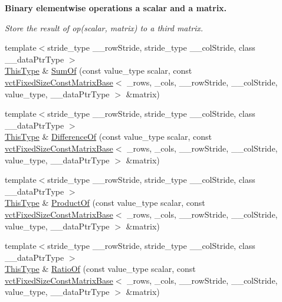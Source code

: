 \begin{Indent}{\bf Binary elementwise operations a scalar and a matrix.}\par
{\em Store the result of op(scalar, matrix) to a third matrix. }\begin{DoxyCompactItemize}
\item 
{\footnotesize template$<$stride\-\_\-type \-\_\-\-\_\-row\-Stride, stride\-\_\-type \-\_\-\-\_\-col\-Stride, class \-\_\-\-\_\-data\-Ptr\-Type $>$ }\\\hyperlink{classvct_fixed_size_const_matrix_base_a7ec66a96ed7e08ce9ff54093133c9d8d}{This\-Type} \& \hyperlink{classvct_fixed_size_matrix_base_afad329402953580776ff2c72254edc61}{Sum\-Of} (const value\-\_\-type scalar, const \hyperlink{classvct_fixed_size_const_matrix_base}{vct\-Fixed\-Size\-Const\-Matrix\-Base}$<$ \-\_\-rows, \-\_\-cols, \-\_\-\-\_\-row\-Stride, \-\_\-\-\_\-col\-Stride, value\-\_\-type, \-\_\-\-\_\-data\-Ptr\-Type $>$ \&matrix)
\item 
{\footnotesize template$<$stride\-\_\-type \-\_\-\-\_\-row\-Stride, stride\-\_\-type \-\_\-\-\_\-col\-Stride, class \-\_\-\-\_\-data\-Ptr\-Type $>$ }\\\hyperlink{classvct_fixed_size_const_matrix_base_a7ec66a96ed7e08ce9ff54093133c9d8d}{This\-Type} \& \hyperlink{classvct_fixed_size_matrix_base_a53bdb7c0294f40c67f4338bdb05ecf93}{Difference\-Of} (const value\-\_\-type scalar, const \hyperlink{classvct_fixed_size_const_matrix_base}{vct\-Fixed\-Size\-Const\-Matrix\-Base}$<$ \-\_\-rows, \-\_\-cols, \-\_\-\-\_\-row\-Stride, \-\_\-\-\_\-col\-Stride, value\-\_\-type, \-\_\-\-\_\-data\-Ptr\-Type $>$ \&matrix)
\item 
{\footnotesize template$<$stride\-\_\-type \-\_\-\-\_\-row\-Stride, stride\-\_\-type \-\_\-\-\_\-col\-Stride, class \-\_\-\-\_\-data\-Ptr\-Type $>$ }\\\hyperlink{classvct_fixed_size_const_matrix_base_a7ec66a96ed7e08ce9ff54093133c9d8d}{This\-Type} \& \hyperlink{classvct_fixed_size_matrix_base_a5ba858bd9d276410c41e4e43fbf0eea5}{Product\-Of} (const value\-\_\-type scalar, const \hyperlink{classvct_fixed_size_const_matrix_base}{vct\-Fixed\-Size\-Const\-Matrix\-Base}$<$ \-\_\-rows, \-\_\-cols, \-\_\-\-\_\-row\-Stride, \-\_\-\-\_\-col\-Stride, value\-\_\-type, \-\_\-\-\_\-data\-Ptr\-Type $>$ \&matrix)
\item 
{\footnotesize template$<$stride\-\_\-type \-\_\-\-\_\-row\-Stride, stride\-\_\-type \-\_\-\-\_\-col\-Stride, class \-\_\-\-\_\-data\-Ptr\-Type $>$ }\\\hyperlink{classvct_fixed_size_const_matrix_base_a7ec66a96ed7e08ce9ff54093133c9d8d}{This\-Type} \& \hyperlink{classvct_fixed_size_matrix_base_a313f0b9eb1c0a5169439eac63a9a0bee}{Ratio\-Of} (const value\-\_\-type scalar, const \hyperlink{classvct_fixed_size_const_matrix_base}{vct\-Fixed\-Size\-Const\-Matrix\-Base}$<$ \-\_\-rows, \-\_\-cols, \-\_\-\-\_\-row\-Stride, \-\_\-\-\_\-col\-Stride, value\-\_\-type, \-\_\-\-\_\-data\-Ptr\-Type $>$ \&matrix)

\end{DoxyCompactItemize}
\end{Indent}
